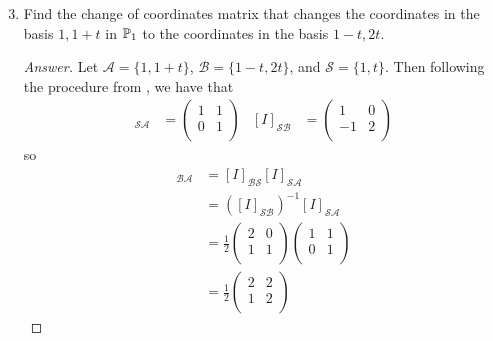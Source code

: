 \documentclass[../psets.tex]{subfiles}
\begin{document}
\begin{enumerate}[label={\textbf{8.\arabic*.}}]
    \setcounter{enumi}{2}
    \item Find the change of coordinates matrix that changes the coordinates in the basis $1,1+t$ in $\mathbb{P}_1$ to the coordinates in the basis $1-t,2t$.
    \begin{proof}[Answer]
        Let $\mathcal{A}=\{1,1+t\}$, $\mathcal{B}=\{1-t,2t\}$, and 
        $\mathcal{S}=\{1,t\}$. Then following the procedure from \textcite{bib:Treil}, we have that
        \begin{align*}
            [I]_{\mathcal{S}\mathcal{A}} &=
            \begin{pmatrix}
                1 & 1\\
                0 & 1\\
            \end{pmatrix}&
            [I]_{\mathcal{S}\mathcal{B}} &=
            \begin{pmatrix}
                1 & 0\\
                -1 & 2\\
            \end{pmatrix}
        \end{align*}
        so
        \begin{align*}
            [I]_{\mathcal{B}\mathcal{A}} &= [I]_{\mathcal{B}\mathcal{S}}[I]_{\mathcal{S}\mathcal{A}}\\
            &= ([I]_{\mathcal{S}\mathcal{B}})^{-1}[I]_{\mathcal{S}\mathcal{A}}\\
            &= \frac{1}{2}
            \begin{pmatrix}
                2 & 0\\
                1 & 1\\
            \end{pmatrix}
            \begin{pmatrix}
                1 & 1\\
                0 & 1\\
            \end{pmatrix}\\
            &= \frac{1}{2}
            \begin{pmatrix}
                2 & 2\\
                1 & 2\\
            \end{pmatrix}
        \end{align*}
    \end{proof}

\end{enumerate}
\end{document}

